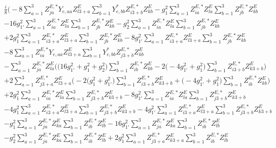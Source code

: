 \begin{align} 
 &\frac{i}{8} \Big(-8 \sum_{a=1}^{3}Z^{E,*}_{j a} Y_{e,{a a}} Z_{{l 3 + a}}^{E}  \sum_{b=1}^{3}Y^*_{e,{b b}} Z^{E,*}_{i 3 + b} Z_{{k b}}^{E}  - g_{1}^{2} \sum_{a=1}^{3}Z^{E,*}_{i a} Z_{{l a}}^{E}  \sum_{b=1}^{3}Z^{E,*}_{j b} Z_{{k b}}^{E}  \nonumber \\ 
 &-16 g_{1'}^{2} \sum_{a=1}^{3}Z^{E,*}_{i a} Z_{{l a}}^{E}  \sum_{b=1}^{3}Z^{E,*}_{j b} Z_{{k b}}^{E}  - g_{2}^{2} \sum_{a=1}^{3}Z^{E,*}_{i a} Z_{{l a}}^{E}  \sum_{b=1}^{3}Z^{E,*}_{j b} Z_{{k b}}^{E}  \nonumber \\ 
 &+2 g_{1}^{2} \sum_{a=1}^{3}Z^{E,*}_{i 3 + a} Z_{{l 3 + a}}^{E}  \sum_{b=1}^{3}Z^{E,*}_{j b} Z_{{k b}}^{E}  -8 g_{1'}^{2} \sum_{a=1}^{3}Z^{E,*}_{i 3 + a} Z_{{l 3 + a}}^{E}  \sum_{b=1}^{3}Z^{E,*}_{j b} Z_{{k b}}^{E}  \nonumber \\ 
 &-8 \sum_{a=1}^{3}Z^{E,*}_{i a} Y_{e,{a a}} Z_{{l 3 + a}}^{E}  \sum_{b=1}^{3}Y^*_{e,{b b}} Z^{E,*}_{j 3 + b} Z_{{k b}}^{E}  \nonumber \\ 
 &- \sum_{a=1}^{3}Z^{E,*}_{j a} Z_{{l a}}^{E}  \Big(\Big(16 g_{1'}^{2}  + g_{1}^{2} + g_{2}^{2}\Big)\sum_{b=1}^{3}Z^{E,*}_{i b} Z_{{k b}}^{E}   -2 \Big(-4 g_{1'}^{2}  + g_{1}^{2}\Big)\sum_{b=1}^{3}Z^{E,*}_{i 3 + b} Z_{{k 3 + b}}^{E}  \Big)\nonumber \\ 
 &+2 \sum_{a=1}^{3}Z^{E,*}_{j 3 + a} Z_{{l 3 + a}}^{E}  \Big(-2 \Big(g_{1}^{2} + g_{1'}^{2}\Big)\sum_{b=1}^{3}Z^{E,*}_{i 3 + b} Z_{{k 3 + b}}^{E}   + \Big(-4 g_{1'}^{2}  + g_{1}^{2}\Big)\sum_{b=1}^{3}Z^{E,*}_{i b} Z_{{k b}}^{E}  \Big)\nonumber \\ 
 &+2 g_{1}^{2} \sum_{a=1}^{3}Z^{E,*}_{i a} Z_{{l a}}^{E}  \sum_{b=1}^{3}Z^{E,*}_{j 3 + b} Z_{{k 3 + b}}^{E}  -8 g_{1'}^{2} \sum_{a=1}^{3}Z^{E,*}_{i a} Z_{{l a}}^{E}  \sum_{b=1}^{3}Z^{E,*}_{j 3 + b} Z_{{k 3 + b}}^{E}  \nonumber \\ 
 &-4 g_{1}^{2} \sum_{a=1}^{3}Z^{E,*}_{i 3 + a} Z_{{l 3 + a}}^{E}  \sum_{b=1}^{3}Z^{E,*}_{j 3 + b} Z_{{k 3 + b}}^{E}  -4 g_{1'}^{2} \sum_{a=1}^{3}Z^{E,*}_{i 3 + a} Z_{{l 3 + a}}^{E}  \sum_{b=1}^{3}Z^{E,*}_{j 3 + b} Z_{{k 3 + b}}^{E}  \nonumber \\ 
 &- g_{1}^{2} \sum_{a=1}^{3}Z^{E,*}_{j a} Z_{{k a}}^{E}  \sum_{b=1}^{3}Z^{E,*}_{i b} Z_{{l b}}^{E}  -16 g_{1'}^{2} \sum_{a=1}^{3}Z^{E,*}_{j a} Z_{{k a}}^{E}  \sum_{b=1}^{3}Z^{E,*}_{i b} Z_{{l b}}^{E}  \nonumber \\ 
 &- g_{2}^{2} \sum_{a=1}^{3}Z^{E,*}_{j a} Z_{{k a}}^{E}  \sum_{b=1}^{3}Z^{E,*}_{i b} Z_{{l b}}^{E}  +2 g_{1}^{2} \sum_{a=1}^{3}Z^{E,*}_{j 3 + a} Z_{{k 3 + a}}^{E}  \sum_{b=1}^{3}Z^{E,*}_{i b} Z_{{l b}}^{E}  \nonumber \\ 

\end{align}
